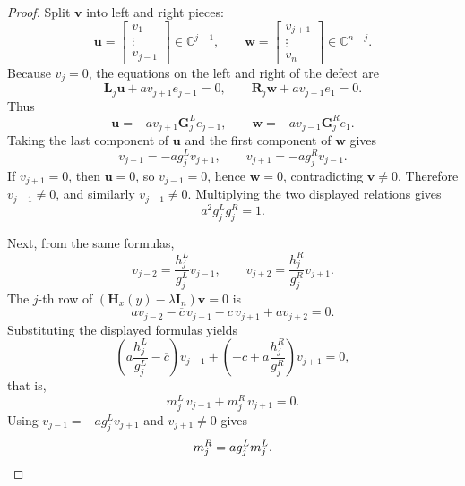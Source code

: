 \documentclass[11pt]{article}
\begin{document}
\begin{proof}
Split \(\mathbf v\) into left and right pieces:
\[
\mathbf u=
\begin{bmatrix}
v_1\\ \vdots\\ v_{j-1}
\end{bmatrix}\in\mathbb C^{j-1},
\qquad
\mathbf w=
\begin{bmatrix}
v_{j+1}\\ \vdots\\ v_n
\end{bmatrix}\in\mathbb C^{n-j}.
\]
Because \(v_j=0\), the equations on the left and right of the defect are
\[
\mathbf L_j \mathbf u + a v_{j+1} e_{j-1}=0,
\qquad
\mathbf R_j \mathbf w + a v_{j-1} e_1=0.
\]
Thus
\[
\mathbf u=-a v_{j+1}\mathbf G_j^L e_{j-1},
\qquad
\mathbf w=-a v_{j-1}\mathbf G_j^R e_1.
\]
Taking the last component of \(\mathbf u\) and the first component of \(\mathbf w\) gives
\[
v_{j-1}=-a g_j^L v_{j+1},
\qquad
v_{j+1}=-a g_j^R v_{j-1}.
\]
If \(v_{j+1}=0\), then \(\mathbf u=0\), so \(v_{j-1}=0\), hence \(\mathbf w=0\), contradicting \(\mathbf v\neq 0\). Therefore \(v_{j+1}\neq 0\), and similarly \(v_{j-1}\neq 0\). Multiplying the two displayed relations gives
\[
a^2 g_j^L g_j^R=1.
\]

Next, from the same formulas,
\[
v_{j-2}=\frac{h_j^L}{g_j^L}v_{j-1},
\qquad
v_{j+2}=\frac{h_j^R}{g_j^R}v_{j+1}.
\]
The \(j\)-th row of \((\mathbf H_x(y)-\lambda\mathbf I_n)\mathbf v=0\) is
\[
a v_{j-2}-\overline c\,v_{j-1}-c\,v_{j+1}+a v_{j+2}=0.
\]
Substituting the displayed formulas yields
\[
\left(a\frac{h_j^L}{g_j^L}-\overline c\right)v_{j-1}
+
\left(-c+a\frac{h_j^R}{g_j^R}\right)v_{j+1}
=0,
\]
that is,
\[
m_j^L\,v_{j-1}+m_j^R\,v_{j+1}=0.
\]
Using \(v_{j-1}=-a g_j^L v_{j+1}\) and \(v_{j+1}\neq 0\) gives
\[
m_j^R=a g_j^L m_j^L.
\qedhere
\]
\end{proof}
\end{document}
